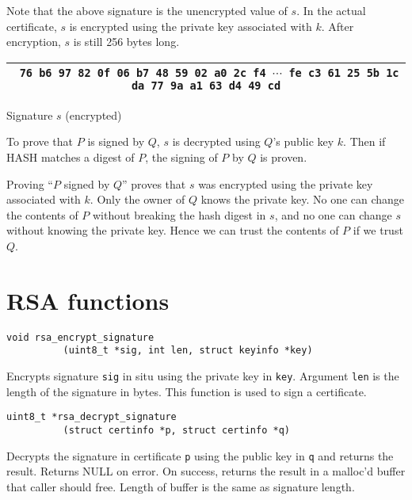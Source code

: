 \documentclass[12pt]{article}
\begin{document}
\bigskip
\noindent
Note that the above signature is the unencrypted value of $s$.
In the actual certificate, $s$ is encrypted using the private key associated with $k$.
After encryption, $s$ is still 256 bytes long.

\begin{center}
\begin{tabular}{|c|}
\hline
{\footnotesize\tt
76 b6 97 82 0f 06 b7 48 59 02 a0 2c f4 $\cdots$
fe c3 61 25 5b 1c da 77 9a a1 63 d4 49 cd}\\
\hline
\end{tabular}

\medskip
Signature $s$ (encrypted)
\end{center}

\noindent
To prove that $P$ is signed by $Q$, $s$ is decrypted using $Q$'s public key $k$.
Then if HASH matches a digest of $P$, the signing of $P$ by $Q$ is proven.

\bigskip
\noindent
Proving ``$P$ signed by $Q$'' proves that $s$ was encrypted using the private key associated with $k$.
Only the owner of $Q$ knows the private key.
No one can change the contents of $P$ without breaking the hash digest in $s$,
and no one can change $s$ without knowing the private key.
Hence we can trust the contents of $P$ if we trust $Q$.

\newpage
\section{RSA functions}

\bigskip
\bigskip
\begin{verbatim}
void rsa_encrypt_signature
          (uint8_t *sig, int len, struct keyinfo *key)
\end{verbatim}

\noindent
Encrypts signature {\tt sig} in situ using the private key in {\tt key}.
Argument {\tt len} is the length of the signature in bytes.
This function is used to sign a certificate.

\bigskip
\bigskip
\begin{verbatim}
uint8_t *rsa_decrypt_signature
          (struct certinfo *p, struct certinfo *q)
\end{verbatim}

\noindent
Decrypts the signature in certificate {\tt p} using the public key in {\tt q} and returns the result.
Returns NULL on error.
On success, returns the result in a malloc'd buffer that caller should free.
Length of buffer is the same as signature length.
\end{document}
